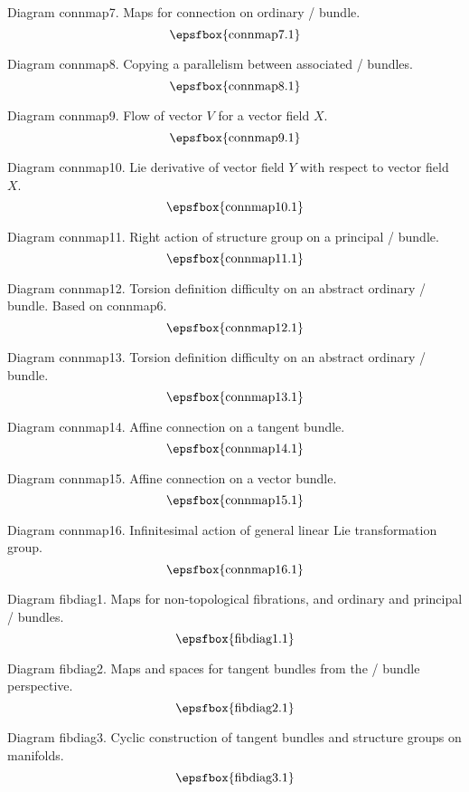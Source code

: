 Diagram connmap7. Maps for connection on ordinary \fibre/ bundle.
$$
\centerline{\epsfbox{connmap7.1}}
$$

\filleject

Diagram connmap8. Copying a parallelism between associated \fibre/ bundles.
$$
\centerline{\epsfbox{connmap8.1}}
$$

Diagram connmap9. Flow of vector $V$ for a vector field $X$.
$$
\centerline{\epsfbox{connmap9.1}}
$$

Diagram connmap10. Lie derivative of vector field $Y$ with respect to vector
field~$X$.
$$
\centerline{\epsfbox{connmap10.1}}
$$

Diagram connmap11. Right action of structure group on a principal \fibre/
bundle.
$$
\centerline{\epsfbox{connmap11.1}}
$$

\filleject

Diagram connmap12. Torsion definition difficulty on an abstract ordinary \fibre/
bundle. Based on connmap6.
$$
\centerline{\epsfbox{connmap12.1}}
$$

Diagram connmap13. Torsion definition difficulty on an abstract ordinary \fibre/
bundle.
$$
\centerline{\epsfbox{connmap13.1}}
$$

Diagram connmap14. Affine connection on a tangent bundle.
$$
\centerline{\epsfbox{connmap14.1}}
$$

\filleject

Diagram connmap15. Affine connection on a vector bundle.
$$
\centerline{\epsfbox{connmap15.1}}
$$

Diagram connmap16. Infinitesimal action of general linear Lie transformation
group.
$$
\centerline{\epsfbox{connmap16.1}}
$$

\secteject
\edef\SECTfibdiag{\the\pageno}

Diagram fibdiag1. Maps for non-topological fibrations, and ordinary and
principal \fibre/ bundles.
$$
\centerline{\epsfbox{fibdiag1.1}}
$$

Diagram fibdiag2. Maps and spaces for tangent bundles from the \fibre/ bundle
perspective.
$$
\centerline{\epsfbox{fibdiag2.1}}
$$

Diagram fibdiag3. Cyclic construction of tangent bundles and structure groups
on manifolds.
$$
\centerline{\epsfbox{fibdiag3.1}}
$$

